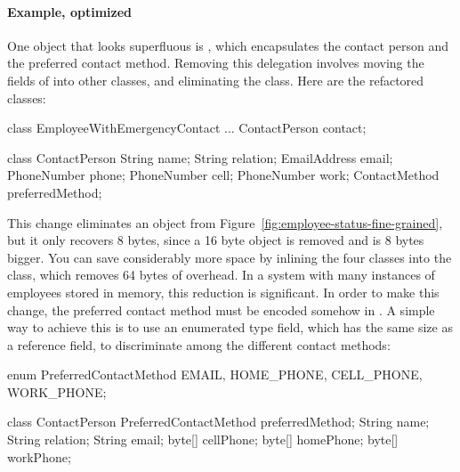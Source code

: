 \paragraph{Example, optimized} One object that looks superfluous is
, which encapsulates the contact person and the
preferred contact method. Removing this delegation involves moving the fields
of  into other classes, and eliminating the  class.
Here are the refactored classes:

\begin{nospanshortlisting}
class EmployeeWithEmergencyContact {
    ...
    ContactPerson contact;
}
			
class ContactPerson {
    String name;
    String relation;
    EmailAddress email;
    PhoneNumber phone;
    PhoneNumber cell;
    PhoneNumber work;
    ContactMethod preferredMethod;
}
\end{nospanshortlisting}

This change eliminates an object from
Figure~\ref{fig:employee-status-fine-grained}, but it only recovers 8 bytes,
since a 16 byte object is removed and  is 8 bytes bigger.
You can save considerably more space by inlining the four 
classes into the  class, which removes 64 bytes of
overhead. In a system with many instances of
employees stored in memory, this reduction is significant. In order to make this change,
the preferred contact method must be encoded somehow in .  A simple way to
achieve this is to use an enumerated type field, which has the same size as a
reference field, to discriminate among the different contact methods:

\begin{shortlisting} 
enum PreferredContactMethod {
    EMAIL, HOME_PHONE, CELL_PHONE, WORK_PHONE;
}
      
class ContactPerson {
    PreferredContactMethod preferredMethod;
    String name;
    String relation;
    String email;
    byte[] cellPhone;
    byte[] homePhone;
    byte[] workPhone;
}		
\end{shortlisting}


